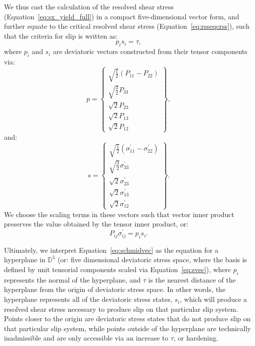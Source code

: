 \documentclass[preprint,3p,times,sort&compress,letterpaper,12pt]{elsarticle} %
\begin{document}
We thus cast the calculation of the resolved shear stress (Equation~\ref{eq:sx_yield_full}) in a compact five-dimensional vector form, and further equate to the critical resolved shear stress (Equation~\ref{eq:rsseqcrss}), such that the criteria for slip is written as:
\begin{equation}
    \label{eq:schmidvec}
    p_i s_i = \tau,
\end{equation}
where $p_i$ and $s_i$ are deviatoric vectors constructed from their tensor components via:
\begin{equation}
    \label{eq:devschmidvec}
    p = \begin{Bmatrix}
            \sqrt{\frac{1}{2}} \left( P_{11} - P_{22} \right) \\
            \sqrt{\frac{3}{2}} P_{33} \\
            \sqrt{2} P_{23} \\
            \sqrt{2} P_{13} \\
            \sqrt{2} P_{12}
        \end{Bmatrix} ,
\end{equation}
and:
\begin{equation}
    \label{eq:svec}
    s = \begin{Bmatrix}
            \sqrt{\frac{1}{2}} \left( \sigma^\prime_{11} - \sigma^\prime_{22} \right) \\
            \sqrt{\frac{3}{2}} \sigma^\prime_{33} \\
            \sqrt{2} \sigma^\prime_{23} \\
            \sqrt{2} \sigma^\prime_{13} \\
            \sqrt{2} \sigma^\prime_{12}
        \end{Bmatrix} .
\end{equation}
We choose the scaling terms in these vectors such that vector inner product preserves the value obtained by the tensor inner product, or:
\begin{equation}
    P_{ij} \sigma_{ij}^\prime = p_i s_i .
\end{equation}

Ultimately, we interpret Equation~\ref{eq:schmidvec} as the equation for a hyperplane in $\mathbb{D}^5$ (or: five dimensional deviatoric stress space, where the basis is defined by unit tensorial components scaled via Equation~\ref{eq:svec}), where $p_i$ represents the normal of the hyperplane, and $\tau$ is the nearest distance of the hyperplane from the origin of deviatoric stress space. In other words, the hyperplane represents all of the deviatoric stress states, $s_i$, which will produce a resolved shear stress necessary to produce slip on that particular slip system. Points closer to the origin are deviatoric stress states that do not produce slip on that particular slip system, while points outside of the hyperplane are technically inadmissible and are only accessible via an increase to $\tau$, or hardening.
\end{document}
